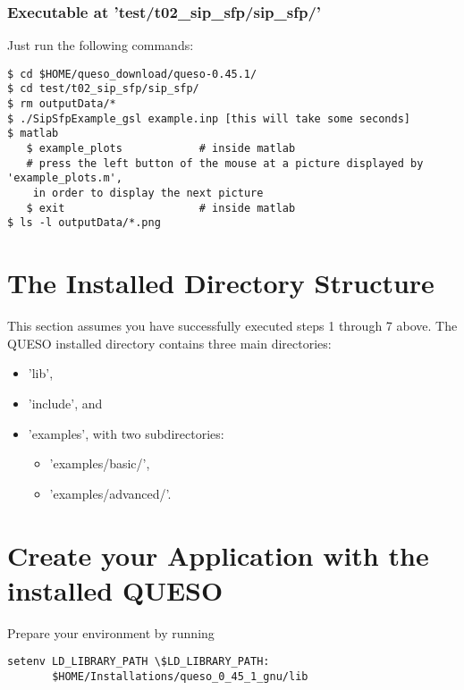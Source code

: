 
\subsubsection{Executable at 'test/t02\_sip\_sfp/sip\_sfp/'}\label{subsc-t02}

Just run the following commands:
\begin{verbatim}
$ cd $HOME/queso_download/queso-0.45.1/
$ cd test/t02_sip_sfp/sip_sfp/
$ rm outputData/*
$ ./SipSfpExample_gsl example.inp [this will take some seconds]
$ matlab
   $ example_plots            # inside matlab
   # press the left button of the mouse at a picture displayed by 'example_plots.m', 
    in order to display the next picture
   $ exit                     # inside matlab
$ ls -l outputData/*.png
\end{verbatim}

\section{The Installed Directory Structure} \label{sc-installed-dir-structure}

This section assumes you have successfully executed steps 1 through 7 above.
The QUESO installed directory contains three main directories:
\begin{itemize}
\item 'lib',
\item 'include', and
\item {'examples', with two subdirectories:
\begin{itemize}
\item 'examples/basic/',
\item 'examples/advanced/'.
\end{itemize}
}
\end{itemize}

\section{Create your Application with the installed QUESO} \label{sc-use-queso}

Prepare your environment by running
\begin{verbatim}
setenv LD_LIBRARY_PATH \$LD_LIBRARY_PATH:
       $HOME/Installations/queso_0_45_1_gnu/lib
\end{verbatim}

